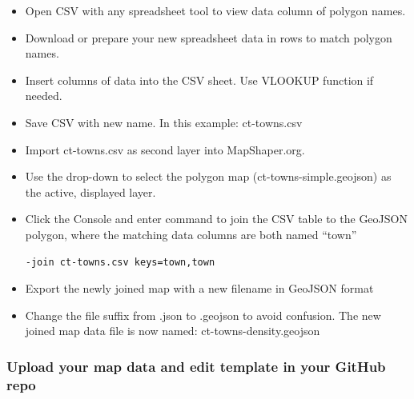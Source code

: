 \documentclass[
  english,
]{book}
\begin{document}
\begin{itemize}
\item
  Open CSV with any spreadsheet tool to view data column of polygon names.
\item
  Download or prepare your new spreadsheet data in rows to match polygon names.
\item
  Insert columns of data into the CSV sheet. Use VLOOKUP function if needed.
\item
  Save CSV with new name. In this example: ct-towns.csv
\item
  Import ct-towns.csv as second layer into MapShaper.org.
\item
  Use the drop-down to select the polygon map (ct-towns-simple.geojson) as the active, displayed layer.
\item
  Click the Console and enter command to join the CSV table to the GeoJSON polygon, where the matching data columns are both named ``town''

\begin{verbatim}
-join ct-towns.csv keys=town,town
\end{verbatim}
\item
  Export the newly joined map with a new filename in GeoJSON format
\item
  Change the file suffix from .json to .geojson to avoid confusion. The new joined map data file is now named: ct-towns-density.geojson
\end{itemize}

\hypertarget{upload-your-map-data-and-edit-template-in-your-github-repo}{%
\subsubsection*{Upload your map data and edit template in your GitHub repo}\label{upload-your-map-data-and-edit-template-in-your-github-repo}}
\end{document}
